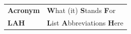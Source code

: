 

\begin{tabular}{ll}
	\textbf{Acronym} & \textbf{W}hat (it) \textbf{S}tands \textbf{F}or \\
	\textbf{LAH} & \textbf{L}ist \textbf{A}bbreviations \textbf{H}ere \\
\end{tabular}
\clearpage
